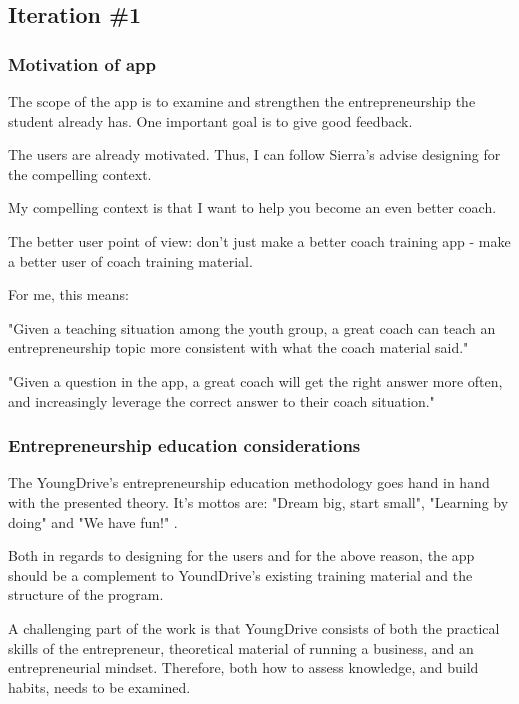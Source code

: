 \subsection{Iteration \#1}

\subsubsection{Motivation of app}
The scope of the app is to examine and strengthen the entrepreneurship the student already has. One important goal is to give good feedback.

The users are already motivated. Thus, I can follow Sierra's advise designing for the compelling context.

My compelling context is that I want to help you become an even better coach.

The better user point of view: don’t just make a better coach training app - make a better user of coach training material.

For me, this means:

"Given a teaching situation among the youth group, a great coach can teach an entrepreneurship topic more consistent with what the coach material said."

"Given a question in the app, a great coach will get the right answer more often, and increasingly leverage the correct answer to their coach situation."

\subsubsection{Entrepreneurship education considerations}
The YoungDrive's entrepreneurship education methodology goes hand in hand with the presented theory. It's mottos are: "Dream big, start small", "Learning by doing" and "We have fun!" \citep{youngdrive}.

Both in regards to designing for the users and for the above reason, the app should be a complement to YoundDrive's existing training material and the structure of the program.

A challenging part of the work is that YoungDrive consists of both the practical skills of the entrepreneur, theoretical material of running a business, and an entrepreneurial mindset. Therefore, both how to assess knowledge, and build habits, needs to be examined.
